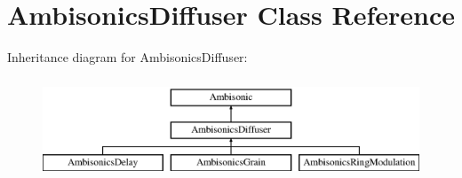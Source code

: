 \hypertarget{class_ambisonics_diffuser}{\section{Ambisonics\-Diffuser Class Reference}
\label{class_ambisonics_diffuser}
}
Inheritance diagram for Ambisonics\-Diffuser\-:\begin{figure}[H]
\begin{center}
\leavevmode
\includegraphics[height=3.000000cm]{class_ambisonics_diffuser}
\end{center}
\end{figure}
